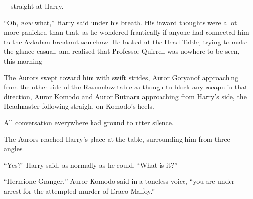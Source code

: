 ---straight at Harry.

``Oh, \emph{now} what,'' Harry said under his breath. His inward
thoughts were a lot more panicked than that, as he wondered frantically
if anyone had connected him to the Azkaban breakout somehow. He looked
at the Head Table, trying to make the glance casual, and realised that
Professor Quirrell was nowhere to be seen, this morning---

The Aurors swept toward him with swift strides, Auror Goryanof
approaching from the other side of the Ravenclaw table as though to
block any escape in that direction, Auror Komodo and Auror Butnaru
approaching from Harry's side, the Headmaster following straight on
Komodo's heels.

All conversation everywhere had ground to utter silence.

The Aurors reached Harry's place at the table, surrounding him from
three angles.

``Yes?'' Harry said, as normally as he could. ``What is it?''

``Hermione Granger,'' Auror Komodo said in a toneless voice, ``you are
under arrest for the attempted murder of Draco Malfoy.''
